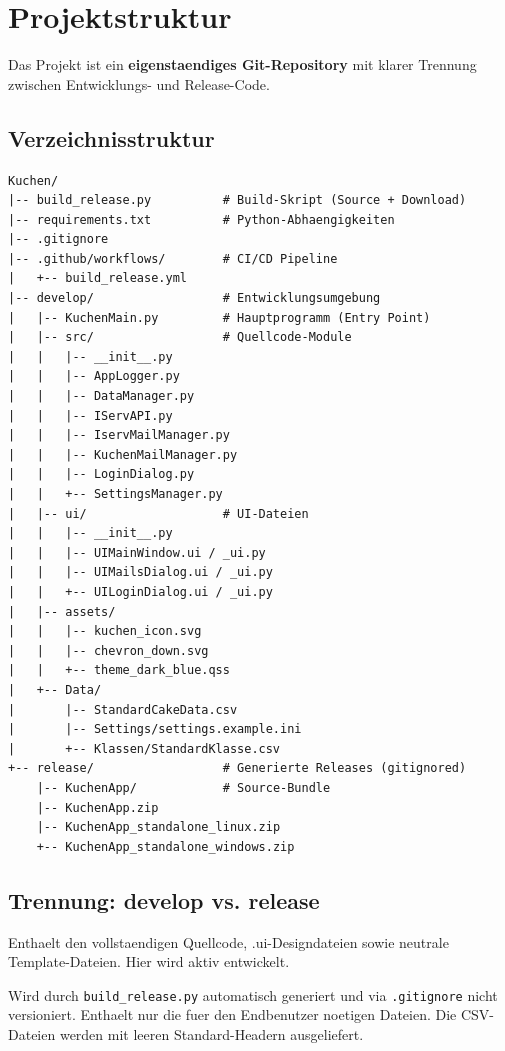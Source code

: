 \documentclass[12pt, a4paper]{article}
\begin{document}
\section{Projektstruktur}

Das Projekt ist ein \textbf{eigenstaendiges Git-Repository} mit klarer Trennung
zwischen Entwicklungs- und Release-Code.

\subsection{Verzeichnisstruktur}

\begin{codebox}[Gesamtstruktur]
\begin{lstlisting}[language={}, numbers=none]
Kuchen/
|-- build_release.py          # Build-Skript (Source + Download)
|-- requirements.txt          # Python-Abhaengigkeiten
|-- .gitignore
|-- .github/workflows/        # CI/CD Pipeline
|   +-- build_release.yml
|-- develop/                  # Entwicklungsumgebung
|   |-- KuchenMain.py         # Hauptprogramm (Entry Point)
|   |-- src/                  # Quellcode-Module
|   |   |-- __init__.py
|   |   |-- AppLogger.py
|   |   |-- DataManager.py
|   |   |-- IServAPI.py
|   |   |-- IservMailManager.py
|   |   |-- KuchenMailManager.py
|   |   |-- LoginDialog.py
|   |   +-- SettingsManager.py
|   |-- ui/                   # UI-Dateien
|   |   |-- __init__.py
|   |   |-- UIMainWindow.ui / _ui.py
|   |   |-- UIMailsDialog.ui / _ui.py
|   |   +-- UILoginDialog.ui / _ui.py
|   |-- assets/
|   |   |-- kuchen_icon.svg
|   |   |-- chevron_down.svg
|   |   +-- theme_dark_blue.qss
|   +-- Data/
|       |-- StandardCakeData.csv
|       |-- Settings/settings.example.ini
|       +-- Klassen/StandardKlasse.csv
+-- release/                  # Generierte Releases (gitignored)
    |-- KuchenApp/            # Source-Bundle
    |-- KuchenApp.zip
    |-- KuchenApp_standalone_linux.zip
    +-- KuchenApp_standalone_windows.zip
\end{lstlisting}
\end{codebox}

\subsection{Trennung: develop vs. release}

\begin{description}[style=nextline, leftmargin=1.5em]
    \item[\texttt{develop/}] Enthaelt den vollstaendigen Quellcode, .ui-Designdateien
        sowie neutrale Template-Dateien. Hier wird aktiv entwickelt.
    \item[\texttt{release/}] Wird durch \texttt{build\_release.py} automatisch generiert
        und via \texttt{.gitignore} nicht versioniert. Enthaelt nur die fuer den
        Endbenutzer noetigen Dateien. Die CSV-Dateien werden mit leeren
        Standard-Headern ausgeliefert.
\end{description}
\end{document}
